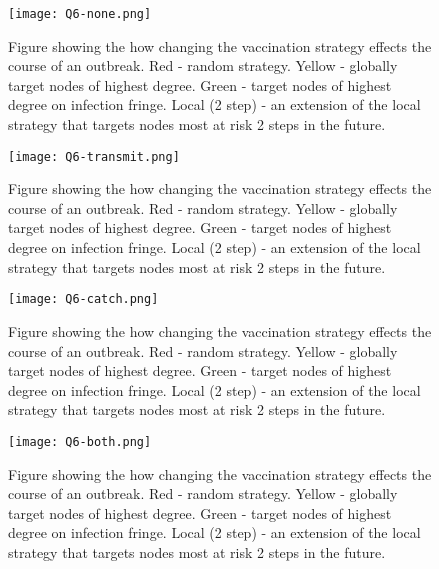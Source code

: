 \begin{figure}[h!]
    \begin{center}
        \texttt{[image: Q6-none.png]}
        \caption{Figure showing the how changing the vaccination strategy effects the course of an outbreak. Red - random strategy. Yellow - globally target nodes of highest degree. Green - target nodes of highest degree on infection fringe. Local (2 step) - an extension of the local strategy that targets nodes most at risk 2 steps in the future.} 
        \label{fig:q6-none}
    \end{center}
\end{figure}

\begin{figure}[h!]
    \begin{center}
        \texttt{[image: Q6-transmit.png]}
        \caption{Figure showing the how changing the vaccination strategy effects the course of an outbreak. Red - random strategy. Yellow - globally target nodes of highest degree. Green - target nodes of highest degree on infection fringe. Local (2 step) - an extension of the local strategy that targets nodes most at risk 2 steps in the future.} 
        \label{fig:q6-transmit}
    \end{center}
\end{figure}

\begin{figure}[h!]
    \begin{center}
        \texttt{[image: Q6-catch.png]}
        \caption{Figure showing the how changing the vaccination strategy effects the course of an outbreak. Red - random strategy. Yellow - globally target nodes of highest degree. Green - target nodes of highest degree on infection fringe. Local (2 step) - an extension of the local strategy that targets nodes most at risk 2 steps in the future.} 
        \label{fig:q6-catch}
    \end{center}
\end{figure}

\begin{figure}[h!]
    \begin{center}
        \texttt{[image: Q6-both.png]}
        \caption{Figure showing the how changing the vaccination strategy effects the course of an outbreak. Red - random strategy. Yellow - globally target nodes of highest degree. Green - target nodes of highest degree on infection fringe. Local (2 step) - an extension of the local strategy that targets nodes most at risk 2 steps in the future.} 
        \label{fig:q6-both}
    \end{center}
\end{figure}